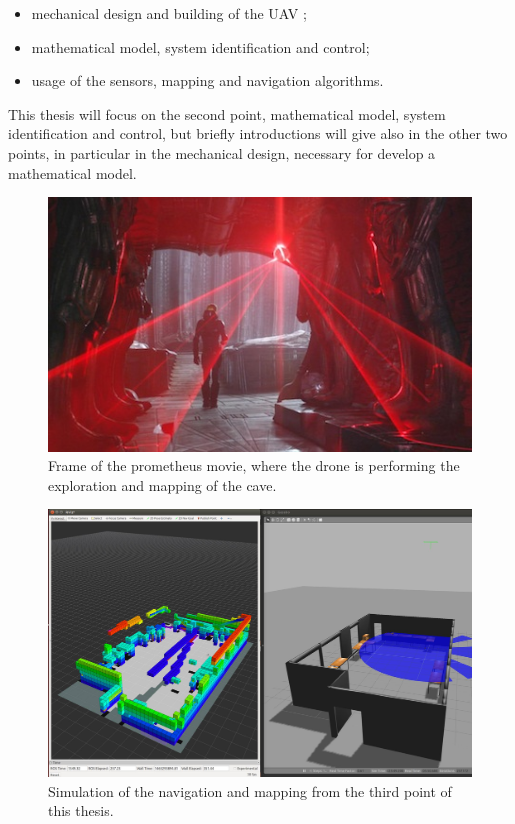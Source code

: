 \begin{itemize}
	\item mechanical design and building of the UAV \cite{Carlos};
	\item mathematical model, system identification and control;
	\item usage of the sensors, mapping and navigation algorithms.
\end{itemize}

\noindent This thesis will focus on the second point, mathematical model, system identification and control, but briefly introductions will give also in the other two points, in particular in the mechanical design, necessary for develop a mathematical model. 

\begin{figure}
	\includegraphics[scale=0.6]{images/prometheus_film.jpg}
	\caption{Frame of the prometheus movie, where the drone is performing the exploration and mapping of the cave.}
	\label{fig:prometheusFILM}
\end{figure}

\begin{figure}
	\includegraphics[scale=0.1364]{images/simulation_Romain.png}
	\caption{Simulation of the navigation and mapping from the third point of this thesis.}
	\label{fig:simulationRomain}
\end{figure}

